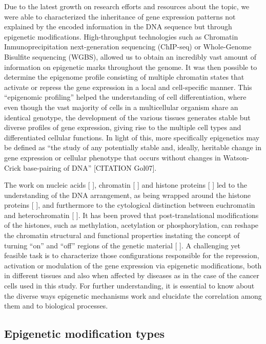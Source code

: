 Due to the latest growth on research efforts and resources about the topic, we were able to characterized the inheritance of gene expression patterns not explained by the encoded information in the DNA sequence but through epigenetic modifications. High-throughput technologies such as Chromatin Inmunoprecipitation next-generation sequencing (ChIP-seq) or Whole-Genome Bisulfite sequencing (WGBS), allowed us to obtain an incredibly vast amount of information on epigenetic marks throughout the genome. It was then possible to determine the epigenome profile consisting of multiple chromatin states that activate or repress the gene expression in a local and cell-specific manner. This ``epigenomic profiling'' helped the understanding of cell differentiation, where even though the vast majority of cells in a multicellular organism share an identical genotype, the development of the various tissues generates stable but diverse profiles of gene expression, giving rise to the multiple cell types and differentiated cellular functions. In light of this, more specifically epigenetics may be defined as “the study of any potentially stable and, ideally, heritable change in gene expression or cellular phenotype that occurs without changes in Watson-Crick base-pairing of DNA” [CITATION Gol07].

\medskip

The work on nucleic acids [ ], chromatin [ ] and histone proteins [ ] led to the understanding of the DNA arrangement, as being wrapped around the histone proteins [ ], and furthermore to the cytological distinction between euchromatin and heterochromatin [ ]. It has been proved that post-translational modifications of the histones, such as methylation, acetylation or phosphorylation, can reshape the chromatin structural and functional properties instating the concept of turning ``on'' and ``off'' regions of the genetic material [ ]. A challenging yet feasible task is to characterize those configurations responsible for the repression, activation or modulation of the gene expression via epigenetic modifications, both in different tissues and also when affected by diseases as in the case of the cancer cells used in this study. For further understanding, it is essential to know about the diverse ways epigenetic mechanisms work and elucidate the correlation among them and to biological processes.

\subsection{Epigenetic modification types}

